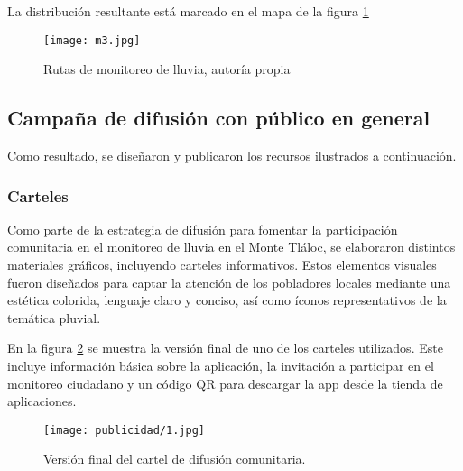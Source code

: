 

La distribución resultante está marcado en el mapa de la figura \ref{m3}

\begin{figure}[h!]
\centering
  \texttt{[image: m3.jpg]}
  \caption{Rutas de monitoreo de lluvia, autoría propia}
  \label{m3}
\end{figure}




\subsection{Campaña de difusión con público en general}
Como resultado, se diseñaron y publicaron los recursos ilustrados a continuación.

\subsubsection{Carteles}

Como parte de la estrategia de difusión para fomentar la participación comunitaria en el monitoreo de lluvia en el Monte Tláloc, se elaboraron distintos materiales gráficos, incluyendo carteles informativos. Estos elementos visuales fueron diseñados para captar la atención de los pobladores locales mediante una estética colorida, lenguaje claro y conciso, así como íconos representativos de la temática pluvial. 

En la figura \ref{fig:cartel1} se muestra la versión final de uno de los carteles utilizados. Este incluye información básica sobre la aplicación, la invitación a participar en el monitoreo ciudadano y un código QR para descargar la app desde la tienda de aplicaciones.

\begin{figure}[H]
\centering
  \texttt{[image: publicidad/1.jpg]}
  \caption{Versión final del cartel de difusión comunitaria.}
  \label{fig:cartel1}
\end{figure}

